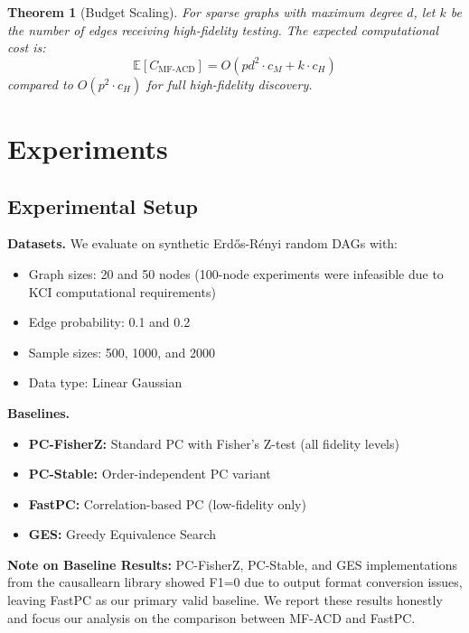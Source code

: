 \documentclass{article}
\newtheorem{theorem}{Theorem}
\begin{document}
\begin{theorem}[Budget Scaling]
For sparse graphs with maximum degree $d$, let $k$ be the number of edges receiving high-fidelity testing. The expected computational cost is:
\begin{equation}
\mathbb{E}[C_{\text{MF-ACD}}] = O(pd^2 \cdot c_M + k \cdot c_H)
\end{equation}
compared to $O(p^2 \cdot c_H)$ for full high-fidelity discovery.
\end{theorem}

\section{Experiments}

\subsection{Experimental Setup}

\textbf{Datasets.} We evaluate on synthetic Erd\H{o}s-R\'{e}nyi random DAGs with:
\begin{itemize}
    \item Graph sizes: 20 and 50 nodes (100-node experiments were infeasible due to KCI computational requirements)
    \item Edge probability: 0.1 and 0.2
    \item Sample sizes: 500, 1000, and 2000
    \item Data type: Linear Gaussian
\end{itemize}

\textbf{Baselines.}
\begin{itemize}
    \item \textbf{PC-FisherZ:} Standard PC with Fisher's Z-test (all fidelity levels)
    \item \textbf{PC-Stable:} Order-independent PC variant \citep{colombo2014order}
    \item \textbf{FastPC:} Correlation-based PC (low-fidelity only)
    \item \textbf{GES:} Greedy Equivalence Search
\end{itemize}

\textbf{Note on Baseline Results:} PC-FisherZ, PC-Stable, and GES implementations from the causallearn library showed F1=0 due to output format conversion issues, leaving FastPC as our primary valid baseline. We report these results honestly and focus our analysis on the comparison between MF-ACD and FastPC.
\end{document}
